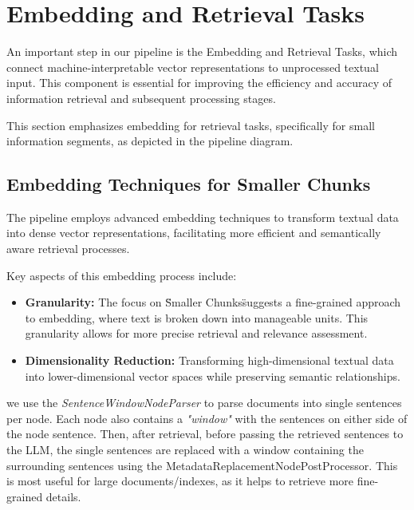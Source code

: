 \section{Embedding and Retrieval Tasks}\label{sec:embedding-and-retrieval-tasks}
An important step in our pipeline is the Embedding and Retrieval Tasks, which connect machine-interpretable vector representations to unprocessed textual input.
This component is essential for improving the efficiency and accuracy of information retrieval and subsequent processing stages.

This section emphasizes embedding for retrieval tasks, specifically for small information segments, as depicted in the pipeline diagram.

\subsection{Embedding Techniques for Smaller Chunks}\label{subsec:embedding-techniques-for-smaller-chunks}
The pipeline employs advanced embedding techniques to transform textual data into dense vector representations, facilitating more efficient and semantically aware retrieval processes.

Key aspects of this embedding process include:
\begin{itemize}
    \item \textbf{Granularity:} The focus on \"Smaller Chunks\" suggests a fine-grained approach to embedding, where text is broken down into manageable units. This granularity allows for more precise retrieval and relevance assessment.
    \item \textbf{Dimensionality Reduction:} Transforming high-dimensional textual data into lower-dimensional vector spaces while preserving semantic relationships.
\end{itemize}

we use the \textit{SentenceWindowNodeParser} to parse documents into single sentences per node.
Each node also contains a \textit{"window"} with the sentences on either side of the node sentence.
Then, after retrieval, before passing the retrieved sentences to the LLM, the single sentences are replaced with a window containing the surrounding sentences using the MetadataReplacementNodePostProcessor.
This is most useful for large documents/indexes, as it helps to retrieve more fine-grained details.

